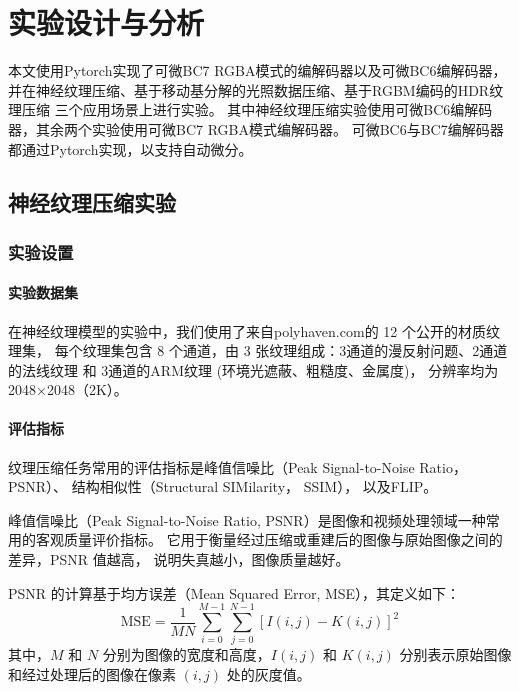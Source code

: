 \section{实验设计与分析}

本文使用Pytorch实现了可微BC7 RGBA模式的编解码器以及可微BC6编解码器，
并在神经纹理压缩、基于移动基分解的光照数据压缩、基于RGBM编码的HDR纹理压缩
三个应用场景上进行实验。
其中神经纹理压缩实验使用可微BC6编解码器，其余两个实验使用可微BC7 RGBA模式编解码器。
可微BC6与BC7编解码器都通过Pytorch实现，以支持自动微分。

\subsection{神经纹理压缩实验}

\subsubsection{实验设置}

\paragraph{实验数据集}

在神经纹理模型的实验中，我们使用了来自polyhaven.com\cite{PolyHaven}的 12 个公开的材质纹理集，
每个纹理集包含 8 个通道，由 3 张纹理组成：3通道的漫反射问题、2通道的法线纹理 和 3通道的ARM纹理 (环境光遮蔽、粗糙度、金属度)，
分辨率均为2048×2048（2K）。

\paragraph{评估指标}

纹理压缩任务常用的评估指标是峰值信噪比（Peak Signal-to-Noise Ratio，PSNR）、
结构相似性（Structural SIMilarity， SSIM）\cite{wang2004image}，
以及FLIP\cite{andersson2020flip}。

峰值信噪比（Peak Signal-to-Noise Ratio, PSNR）是图像和视频处理领域一种常用的客观质量评价指标。
它用于衡量经过压缩或重建后的图像与原始图像之间的差异，PSNR 值越高，
说明失真越小，图像质量越好。

PSNR 的计算基于均方误差（Mean Squared Error, MSE），其定义如下：
\begin{equation}
\text{MSE} = \frac{1}{MN} \sum_{i=0}^{M-1} \sum_{j=0}^{N-1} \left[ I(i,j) - K(i,j) \right]^2
\end{equation}
其中，$M$ 和 $N$ 分别为图像的宽度和高度，$I(i,j)$ 和 $K(i,j)$ 分别表示原始图像和经过处理后的图像在像素 $(i,j)$ 处的灰度值。

